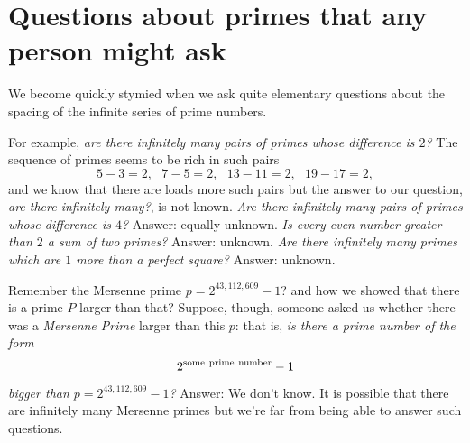 \documentclass[11pt]{article}
\theoremstyle{plain}
\theoremstyle{definition}
\numberwithin{equation}{section}
\numberwithin{figure}{section}
\numberwithin{table}{section}
\begin{document}



\section{Questions about primes that any person might ask}

We become quickly stymied when we ask quite elementary questions about
the spacing of the infinite series of prime numbers.

\bigskip

For example, {\em are there infinitely many pairs of primes whose
  difference is $2$?}  The sequence of primes seems to be rich in such
pairs $$5-3 =2,\ \ \ 7-5=2,\ \ \ 13-11=2,\ \ \ 19-17 =2,$$ and we know
that there are loads more such pairs but the answer to our question,
{\em are there infinitely many?}, is not known. {\em Are there
  infinitely many pairs of primes whose difference is $4$?}  Answer:
equally unknown. {\em Is every even number greater than $2$ a sum of
  two primes?}  Answer: unknown. {\em Are there infinitely many primes
  which are $1$ more than a perfect square?}  Answer: unknown.


\bigskip

Remember the Mersenne prime $p= 2^{43,112,609}-1$? and how we showed
that there is a prime $P$ larger than that? Suppose, though, someone
asked us whether there was a {\it Mersenne Prime} larger than this
$p$: that is, {\em is there a prime number of the form $$2^{\rm some\
  prime\ number}-1$$ bigger than $p= 2^{43,112,609}-1$?} Answer:  We don't
know. It is possible that there are infinitely many Mersenne primes
but we're far from being able to answer such questions.

\bigskip
\end{document}
